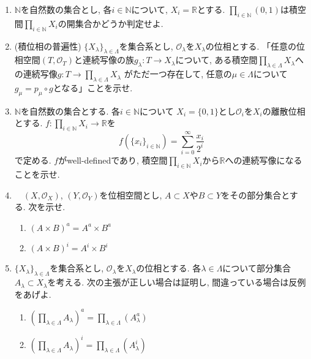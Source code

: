 \documentclass[dvipdfmx,a4paper,11pt]{article}
\newcommand{\R}{\mathbb{R}}
\newcommand{\N}{\mathbb{N}}
\theoremstyle{definition}
\begin{document}
\begin{enumerate}[ label=\textbf{問}5.\arabic*]
\item $\N$を自然数の集合とし, 各$i \in \N$について, $X_{i} =\R $とする. %
$\prod_{i \in \N} (0,1)$は積空間$\prod_{i \in \N} X_{i}$の開集合かどうか判定せよ.
	


\item (積位相の普遍性)
$\{ X_\lambda \}_{\lambda \in \Lambda}$を集合系とし, $\mathscr{O}_{\lambda}$を$X_{\lambda}$の位相とする. 
「任意の位相空間$(T, \mathscr{O}_{T})$と連続写像の族$g_{\lambda} : T \rightarrow X_\lambda $について, 
ある積空間$\prod_{\lambda \in \Lambda} X_{\lambda}$への連続写像$g : T \rightarrow \prod_{\lambda \in \Lambda} X_{\lambda}$
がただ一つ存在して, 任意の$\mu \in \Lambda$について$g_{\mu} = p_{\mu} \circ g $となる」ことを示せ. 

\item $\N$を自然数の集合とする. 各$i \in \N$について $X_{i} = \{ 0,1\}$とし$ \mathscr{O}_{i}$を$X_i$の離散位相とする.
$f :\prod_{i \in \N} X_{i} \rightarrow \R$を
$$
f (\{ x_i\}_{i \in \N}) = \sum_{i=0}^{\infty} \frac{x_i}{2^i}
$$
で定める. $f$がwell-definedであり, 積空間$\prod_{i \in \N} X_{i}$から$\R$への連続写像になることを示せ.


\item　$(X, \mathscr{O}_X )$, $(Y, \mathscr{O}_Y)$を位相空間とし, $A \subset X$や$B \subset Y$をその部分集合とする. 次を示せ.
	\begin{enumerate}
	\item $(A \times  B)^a = A^a \times B^a$
	\item $(A \times  B)^i = A^i \times B^i$
	\end{enumerate}


\item $\{ X_\lambda \}_{\lambda \in \Lambda}$を集合系とし, $\mathscr{O}_{\lambda}$を$X_{\lambda}$の位相とする. 各$\lambda \in \Lambda$について部分集合$A_{\lambda} \subset X_{\lambda}$を考える.  次の主張が正しい場合は証明し, 間違っている場合は反例をあげよ.
	\begin{enumerate}
	\item $(\prod_{\lambda \in \Lambda} A_{\lambda})^a =\prod_{\lambda \in \Lambda} (A_{\lambda}^a)$
	\item $(\prod_{\lambda \in \Lambda} A_{\lambda})^i =\prod_{\lambda \in \Lambda} (A_{\lambda}^i)$
	\end{enumerate}
	
 \end{enumerate}

 
\end{document}
